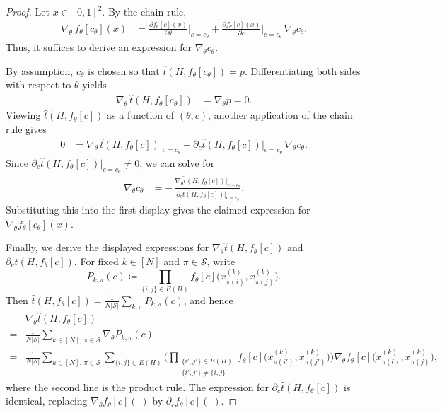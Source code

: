 \documentclass{article}
\theoremstyle{plain}
\theoremstyle{definition}
\theoremstyle{remark}
\begin{document}
\begin{proof}
Let \(x \in [0,1]^2\). By the chain rule,
\begin{align*}
\nabla_\theta\, f_\theta[c_\theta](x)
&= \frac{\partial f_\theta[c](x)}{\partial \theta}\Big|_{c=c_\theta}
 + \frac{\partial f_\theta[c](x)}{\partial c}\Big|_{c=c_\theta}\, \nabla_\theta c_\theta.
\end{align*}
Thus, it suffices to derive an expression for \(\nabla_\theta c_\theta\).

By assumption, \(c_\theta\) is chosen so that
\(\widehat{t}(H,f_\theta[c_\theta]) = p\).
Differentiating both sides with respect to \(\theta\) yields
\begin{align*}
\nabla_\theta\,\widehat{t}(H,f_\theta[c_\theta]) &= \nabla_\theta p = 0.
\end{align*}
Viewing \(\widehat{t}(H,f_\theta[c])\) as a function of \((\theta,c)\), another application of the chain rule gives
\begin{align*}
0
&= \nabla_\theta\,\widehat{t}(H,f_\theta[c])\Big|_{c=c_\theta}
 + \partial_c\widehat{t}(H,f_\theta[c])\Big|_{c=c_\theta}\, \nabla_\theta c_\theta.
\end{align*}
Since \(\partial_c\widehat{t}(H,f_\theta[c])\big|_{c=c_\theta} \neq 0\), we can solve for
\begin{align*}
\nabla_\theta c_\theta
&= {-}\,\frac{\nabla_\theta\widehat{t}(H,f_\theta[c])\big|_{c=c_\theta}}{\partial_c\widehat{t}(H,f_\theta[c])\big|_{c=c_\theta}}.
\end{align*}
Substituting this into the first display gives the claimed expression for
\(\nabla_\theta f_\theta[c_\theta](x)\).

Finally, we derive the displayed expressions for \(\nabla_\theta\widehat{t}(H,f_\theta[c])\) and
\(\partial_c\widehat{t}(H,f_\theta[c])\). For fixed \(k\in[N]\) and \(\pi\in\mathcal{S}\), write
\[
P_{k,\pi}(c) \coloneqq \prod_{\{i,j\}\in E(H)} f_\theta[c]\bigl(x_{\pi(i)}^{(k)},x_{\pi(j)}^{(k)}\bigr).
\]
Then \(\widehat{t}(H,f_\theta[c]) = \frac{1}{N|\mathcal{S}|}\sum_{k,\pi} P_{k,\pi}(c)\), and hence
\begin{align*}
&\nabla_\theta\widehat{t}(H,f_\theta[c])
\\
{} = &\frac{1}{N|\mathcal{S}|}\sum_{k\in[N],\,\pi\in\mathcal{S}} \nabla_\theta P_{k,\pi}(c)
\\
{} = &\frac{1}{N|\mathcal{S}|}\sum_{k\in[N],\,\pi\in\mathcal{S}}
\sum_{\{i,j\}\in E(H)}
\Bigg(\prod_{\substack{\{i',j'\}\in E(H)\\ \{i',j'\}\neq\{i,j\}}}
f_\theta[c]\bigl(x_{\pi(i')}^{(k)},x_{\pi(j')}^{(k)}\bigr)\Bigg)
\nabla_\theta f_\theta[c]\bigl(x_{\pi(i)}^{(k)},x_{\pi(j)}^{(k)}\bigr),
\end{align*}
where the second line is the product rule.
The expression for \(\partial_c\widehat{t}(H,f_\theta[c])\) is identical, replacing
\(\nabla_\theta f_\theta[c](\cdot)\) by \(\partial_c f_\theta[c](\cdot)\).
\end{proof}
\end{document}
